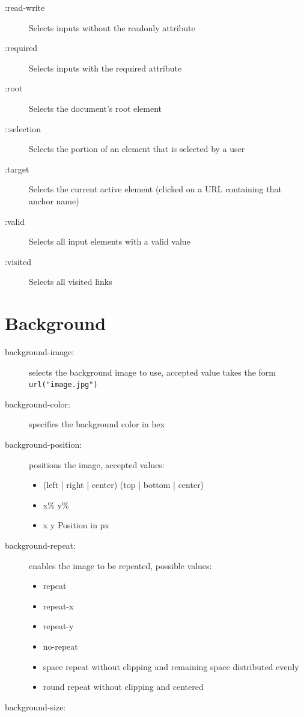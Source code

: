 \documentclass[12pt, a4paper]{article}
\begin{document}
\begin{multicols*}{2}
\begin{description}
			\item[:read-write] Selects inputs without the readonly attribute
			\item[:required] Selects inputs with the required attribute
			\item[:root] Selects the document's root element
			\item[::selection] Selects the portion of an element that is selected by a user
			\item[:target] Selects the current active element (clicked on a URL containing that anchor name)
			\item[:valid] Selects all input elements with a valid value
			\item[:visited] Selects all visited links
		\end{description}
		
		\section{Background}
		\begin{description}
			\item[background-image:] selects the background image to use, accepted value takes the form \texttt{url("image.jpg")}
			\item[background-color:] specifies the background color in hex
			\item[background-position:] positions the image, accepted values: 
			\begin{itemize}
				\item (left | right | center) (top | bottom | center)
				\item x\% y\%
				\item x y 
				\subitem Position in px
			\end{itemize}
			\item[background-repeat:] enables the image to be repeated, possible values:
			\begin{itemize}
				\item repeat
				\item repeat-x
				\item repeat-y
				\item no-repeat
				\item space
				\subitem repeat without clipping and remaining space distributed evenly
				\item round
				\subitem repeat without clipping and centered	
			\end{itemize}
			\item[background-size:]
		\end{description}
		
		
	\end{multicols*}
		
\end{document}
